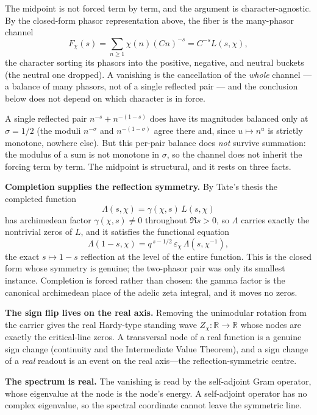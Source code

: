 \documentclass[11pt]{article}
\begin{document}
The midpoint is not forced term by term, and the argument is character-agnostic.
By the closed-form phasor representation above, the fiber is the many-phasor
channel
\[
  F_\chi(s)=\sum_{n\ge1}\chi(n)(Cn)^{-s}=C^{-s}L(s,\chi),
\]
the character sorting its phasors into the positive, negative, and neutral
buckets (the neutral one dropped).  A vanishing is the cancellation of the
\emph{whole} channel --- a balance of many phasors, not of a single reflected
pair --- and the conclusion below does not depend on which character is in
force.

A single reflected pair $n^{-s}+n^{-(1-s)}$ does have its magnitudes balanced
only at $\sigma=1/2$ (the moduli $n^{-\sigma}$ and $n^{-(1-\sigma)}$ agree there
and, since $u\mapsto n^{u}$ is strictly monotone, nowhere else).  But this
per-pair balance does \emph{not} survive summation: the modulus of a sum is not
monotone in $\sigma$, so the channel does not inherit the forcing term by term.
The midpoint is structural, and it rests on three facts.

\textbf{Completion supplies the reflection symmetry.}  By Tate's thesis the
completed function
\[
  \Lambda(s,\chi)=\gamma(\chi,s)\,L(s,\chi)
\]
has archimedean factor $\gamma(\chi,s)\ne0$ throughout $\Re s>0$, so $\Lambda$
carries exactly the nontrivial zeros of $L$, and it satisfies the functional
equation
\[
  \Lambda(1-s,\chi)=q^{\,s-1/2}\,\varepsilon_\chi\,\Lambda(s,\chi^{-1}),
\]
the exact $s\mapsto1-s$ reflection at the level of the entire function.  This is
the closed form whose symmetry is genuine; the two-phasor pair was only its
smallest instance.  Completion is forced rather than chosen: the gamma factor is
the canonical archimedean place of the adelic zeta integral, and it moves no
zeros.

\textbf{The sign flip lives on the real axis.}  Removing the unimodular rotation
from the carrier gives the real Hardy-type standing wave
$Z_\chi:\mathbb R\to\mathbb R$ whose nodes are exactly the critical-line zeros.
A transversal node of a real function is a genuine sign change (continuity and
the Intermediate Value Theorem), and a sign change of a \emph{real} readout is an
event on the real axis---the reflection-symmetric centre.

\textbf{The spectrum is real.}  The vanishing is read by the self-adjoint Gram
operator, whose eigenvalue at the node is the node's energy.  A self-adjoint
operator has no complex eigenvalue, so the spectral coordinate cannot leave the
symmetric line.
\end{document}

